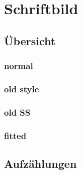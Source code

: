 %
%
%
%
\chapter{Schriftbild}

\section{Übersicht}

\subsection{normal}

\subsection{old style}

\subsection{old SS}

\subsection{fitted}


%
%
%

\newpage
\section{Aufzählungen}
